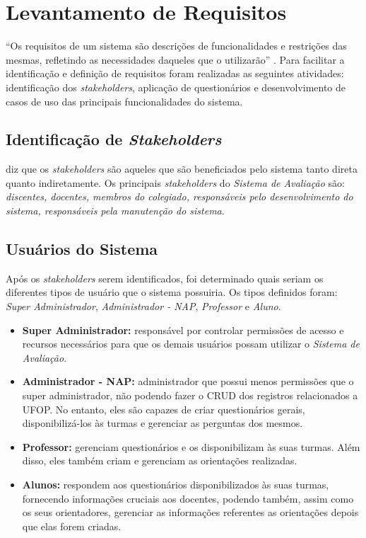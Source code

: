 \documentclass[
  12pt,       %
  openright,      %
  oneside,      %
  a4paper,      %
  english,      %
  french,        %
  spanish,     %
  brazil        %
  ]{abntex2-decsi}
\begin{document}
    \section{Levantamento de Requisitos}

    ``Os requisitos de um sistema são descrições de funcionalidades e restrições das mesmas, refletindo as necessidades daqueles que o utilizarão'' \cite[p. 83, tradução nossa]{sommervile:2011}. Para facilitar a identificação e definição de requisitos foram realizadas as seguintes atividades: identificação dos \textit{stakeholders}, aplicação de questionários e desenvolvimento de casos de uso das principais funcionalidades do sistema.

    \subsection{Identificação de \textit{Stakeholders}}

     diz que os \textit{stakeholders} são aqueles que são beneficiados pelo sistema tanto direta quanto indiretamente. Os principais \textit{stakeholders} do \textit{Sistema de Avaliação} são: \textit{discentes, docentes, membros do colegiado, responsáveis pelo desenvolvimento do sistema, responsáveis pela manutenção do sistema}.   

    \subsection{Usuários do Sistema}

    Após os \textit{stakeholders} serem identificados, foi determinado quais seriam os diferentes tipos de usuário que o sistema possuiria. Os tipos definidos foram: \textit{Super Administrador}, \textit{Administrador - NAP}, \textit{Professor} e \textit{Aluno}.

    \begin{itemize}
        \item \textbf{Super Administrador: } responsável por controlar permissões de acesso e recursos necessários para que os demais usuários possam utilizar o \textit{Sistema de Avaliação}.
        \item \textbf{Administrador - NAP: } administrador que possui menos permissões que o super administrador, não podendo fazer o CRUD dos registros relacionados a UFOP. No entanto, eles são capazes de criar questionários gerais, disponibilizá-los às turmas e gerenciar as perguntas dos mesmos. 
        \item \textbf{Professor: } gerenciam questionários e os disponibilizam às suas turmas. Além disso, eles também criam e gerenciam as orientações realizadas.
        \item \textbf{Alunos: } respondem aos questionários disponibilizados às suas turmas, fornecendo informações cruciais aos docentes, podendo também, assim como os seus orientadores, gerenciar as informações referentes as orientações depois que elas forem criadas.
    \end{itemize}   
\end{document}
